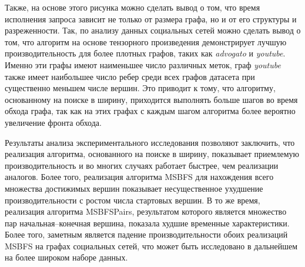 Также, на основе этого рисунка можно сделать вывод о том, что время исполнения запроса зависит не только от размера графа, но и от его структуры и разреженности. Так, по анализу данных социальных сетей можно сделать вывод о том, что алгоритм на основе тензорного произведения демонстрирует лучшую производительность для более плотных графов, таких как \textit{advogato} и \textit{youtube}. Именно эти графы имеют наименьшее число различных меток, граф \textit{youtube} также имеет наибольшее число ребер среди всех графов датасета при существенно меньшем числе вершин. Это приводит к тому, что алгоритму, основанному на поиске в ширину, приходится выполнять больше шагов во время обхода графа, так как на этих графах с каждым шагом алгоритма более вероятно увеличение фронта обхода.

Результаты анализа экспериментального исследования позволяют заключить, что реализация алгоритма, основанного на поиске в ширину, показывает приемлемую производительность и во многих случаях работает быстрее, чем реализации аналогов. Более того, реализация алгоритма MSBFS для нахождения всего множества достижимых вершин показывает несущественное ухудшение производительности с ростом числа стартовых вершин. В то же время, реализация алгоритма MSBFSPairs, результатом которого является множество пар начальная--конечная вершина, показала худшие временные характеристики. Более того, заметным является падение производительности обоих реализаций MSBFS на графах социальных сетей, что может быть исследовано в дальнейшем на более широком наборе данных.
